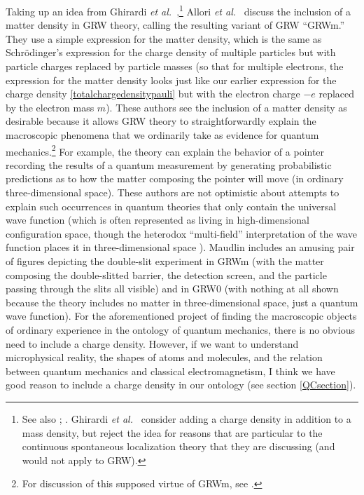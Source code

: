 \documentclass[onecolumn,secnumarabic,amsmath,amssymb,balancelastpage,nofootinbib]{article}
\begin{document}
Taking up an idea from Ghirardi \emph{et al.}\ \cite{ghirardi1995, ghirardi1997},\footnote{See also \cite[pg.\ 38]{goldstein1998}; \cite{maudlin2007}.  Ghirardi \emph{et al.}\ \cite[sec.\ 4.3]{ghirardi1995} consider adding a charge density in addition to a mass density, but reject the idea for reasons that are particular to the continuous spontaneous localization theory that they are discussing (and would not apply to GRW).} Allori \emph{et al.}\ \cite{tumulka2007, allori2008, allori2011, allori2014, goldstein2012} discuss the inclusion of a matter density in GRW theory, calling the resulting variant of GRW ``GRWm.''  They use a simple expression for the matter density, which is the same as Schr\"{o}dinger's expression for the charge density of multiple particles but with particle charges replaced by particle masses (so that for multiple electrons, the expression for the matter density looks just like our earlier expression for the charge density \eqref{totalchargedensitypauli} but with the electron charge $-e$ replaced by the electron mass $m$).  These authors see the inclusion of a matter density as desirable because it allows GRW theory to straightforwardly explain the macroscopic phenomena that we ordinarily take as evidence for quantum mechanics.\footnote{For discussion of this supposed virtue of GRWm, see \cite{maudlin2007, ney2013, neyalbert2013, ney2021}.}  For example, the theory can explain the behavior of a pointer recording the results of a quantum measurement by generating probabilistic predictions as to how the matter composing the pointer will move (in ordinary three-dimensional space).  These authors are not optimistic about attempts to explain such occurrences in quantum theories that only contain the universal wave function (which is often represented as living in high-dimensional configuration space, though the heterodox ``multi-field'' interpretation of the wave function places it in three-dimensional space \cite{forrest1988, belot2012, hubert2018, chen2017, chen2019, romanoF}).  Maudlin \cite[ch.\ 10]{maudlin2011} includes an amusing pair of figures depicting the double-slit experiment in GRWm (with the matter composing the double-slitted barrier, the detection screen, and the particle passing through the slits all visible) and in GRW0 (with nothing at all shown because the theory includes no matter in three-dimensional space, just a quantum wave function).  For the aforementioned project of finding the macroscopic objects of ordinary experience in the ontology of quantum mechanics, there is no obvious need to include a charge density.  However, if we want to understand microphysical reality, the shapes of atoms and molecules, and the relation between quantum mechanics and classical electromagnetism, I think we have good reason to include a charge density in our ontology (see section \ref{QCsection}).
\end{document}
